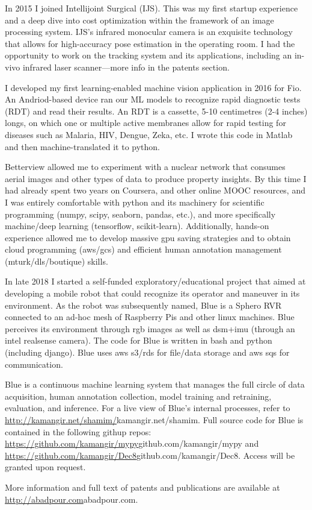 \vspace{0.5cm}
In 2015 I joined Intellijoint Surgical (IJS). This was my first startup experience and a deep dive into cost optimization within the framework of an image processing system. IJS's infrared monocular camera is an exquisite technology that allows for high-accuracy pose estimation in the operating room. I had the opportunity to work on the tracking system and its applications, including an in-vivo infrared laser scanner—more info in the patents section.

\vspace{0.5cm}
I developed my first learning-enabled machine vision application in 2016 for Fio. An Andriod-based device ran our ML
models to recognize rapid diagnostic tests (RDT) and read their results. An RDT is a cassette, 5-10 centimetres (2-4 inches) longs, on
which one or multiple active membranes allow for rapid testing for diseases such as Malaria, HIV, Dengue, Zeka, etc. I wrote this code in Matlab and then machine-translated it to python. 

\vspace{0.5cm}
Betterview allowed me to experiment with a nuclear network that consumes aerial images and other types of data to 
produce property insights. By this time I had already spent two years on Coursera, and other online MOOC resources, and I was entirely comfortable with python and its machinery for scientific programming (numpy, scipy, seaborn, pandas, etc.), and more specifically machine/deep learning (tensorflow, scikit-learn). Additionally, hands-on experience allowed me to develop massive gpu saving strategies and to obtain cloud programming (aws/gcs) and efficient human annotation management (mturk/dls/boutique) skills.

\vspace{0.5cm}
In late 2018 I started a self-funded exploratory/educational project that aimed at developing a mobile robot that could recognize its
operator and maneuver in its environment. As the robot was subsequently named, Blue is a Sphero RVR connected to an ad-hoc mesh of Raspberry Pis and other linux machines. Blue perceives its environment through rgb images as well as dsm+imu (through an intel realsense camera). The code for Blue is written in bash and python (including django). Blue uses aws s3/rds for file/data storage and aws sqs for communication. 

\vspace{0.5cm}
Blue is a continuous machine learning system that manages the full circle of data acquisition, human annotation collection, model training and
retraining, evaluation, and inference. For a live view of Blue's internal processes, refer to \url{http://kamangir.net/shamim/}{kamangir.net/shamim}. 
Full source code for Blue is contained in the following githup repos: \url{https://github.com/kamangir/mypy}{github.com/kamangir/mypy} 
and \url{https://github.com/kamangir/Dec8}{github.com/kamangir/Dec8}. Access will be granted upon request.

\vspace{0.5cm}
More information and full text of patents and publications are available at \url{http://abadpour.com}{abadpour.com}.

\vspace{1.5cm}
